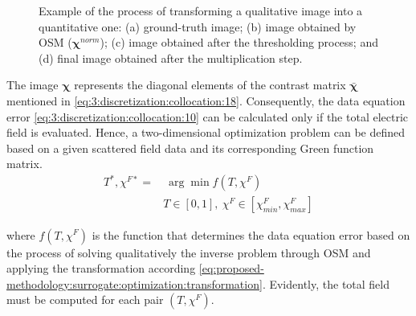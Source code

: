 \begin{figure}[!h]
				\caption[Example of the process of transforming a qualitative image into a quantitative one.]{Example of the process of transforming a qualitative image into a quantitative one: (a) ground-truth image; (b) image obtained by OSM ($\boldsymbol{\chi}^{norm}$); (c) image obtained after the thresholding process; and (d) final image obtained after the multiplication step.}
				\label{fig:proposed-methodology:surrogate:optimization:transformation}
			\end{figure}
			
			The image $\boldsymbol{\chi}$ represents the diagonal elements of the contrast matrix $\boldsymbol{\bar{\chi}}$ mentioned in \eqref{eq:3:discretization:collocation:18}. Consequently, the data equation error \eqref{eq:3:discretization:collocation:10} can be calculated only if the total electric field is evaluated. Hence, a two-dimensional optimization problem can be defined based on a given scattered field data and its corresponding Green function matrix.
			\begin{align}
				T^*, \chi^{F*} =&~\arg\min f(T, \chi^F) \label{eq:proposed-methodology:surrogate:optimization:definition:objfun} \\
				& T\in[0, 1],~ \chi^{F} \in [\chi^F_{min}, \chi^F_{max}] \label{eq:proposed-methodology:surrogate:optimization:definition:bounds} 
			\end{align}
			
			\noindent where $ f(T, \chi^F)$ is the function that determines the data equation error based on the process of solving qualitatively the inverse problem through OSM and applying the transformation according \eqref{eq:proposed-methodology:surrogate:optimization:transformation}. Evidently, the total field must be computed for each pair $(T, \chi^F)$.
			
